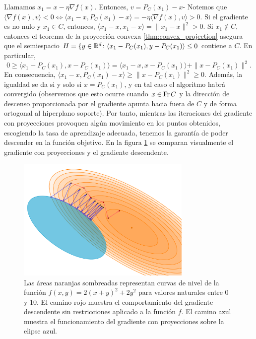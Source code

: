 Llamamos $x_1 = x - \eta\nabla f(x)$. Entonces, $v = P_C(x_1) - x$- Notemos que $\langle \nabla f(x), v \rangle < 0 \iff \langle x_1 - x, P_C(x_1) - x \rangle = -\eta \langle \nabla f(x), v \rangle > 0$. Si el gradiente es no nulo y $x_1 \in C$, entonces, $\langle x_1 - x, x_1 - x \rangle = \|x_1 - x \|^2 > 0$. Si $x_1 \notin C$, entonces el teorema de la proyección convexa \ref{thm:convex_projection} asegura que el semiespacio $H = \{y \in \mathbb{R}^d \colon \langle x_1 - P_C(x_1), y - P_C(x_1) \rangle \le 0$ contiene a $C$. En particular,
\[ 0 \ge \langle x_1 - P_C(x_1), x - P_C(x_1) \rangle = \langle x_1 - x, x - P_C(x_1) \rangle + \|x - P_C(x_1)\|^2.  \]
En consecuencia, $ \langle x_1 - x, P_C(x_1) - x \rangle \ge \|x - P_C(x_1)\|^2 \ge 0$. Además, la igualdad se da si y solo si $x = P_C(x_1)$, y en tal caso el algoritmo habrá convergido (observemos que esto ocurre cuando $x \in \operatorname{Fr} C$ y la dirección de descenso proporcionada por el gradiente apunta hacia fuera de $C$ y de forma ortogonal al hiperplano soporte). Por tanto, mientras las iteraciones del gradiente con proyecciones provoquen algún movimiento en los puntos obtenidos, escogiendo la tasa de aprendizaje adecuada, tenemos la garantía de poder descender en la función objetivo. En la figura \ref{fig:gradient} se comparan visualmente el gradiente con proyecciones y el gradiente descendente.

\begin{figure}[h]
    \centering
    \includegraphics[width=0.75\textwidth]{./images/gradient.png}
    \caption{Las áreas naranjas sombreadas representan curvas de nivel de la función $f(x,y) = 2(x+y)^2 + 2y^2$ para valores naturales entre $0$ y $10$. El camino rojo muestra el comportamiento del gradiente descendente sin restricciones aplicado a la función $f$. El camino azul muestra el funcionamiento del gradiente con proyecciones sobre la elipse azul.} \label{fig:gradient}
\end{figure}


